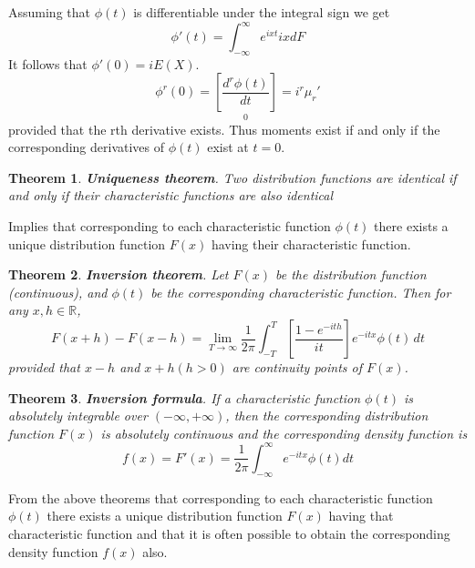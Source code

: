 \documentclass{article}
\newtheorem{theorem}{Theorem}[section]
\begin{document}
Assuming that \(\phi(t)\) is differentiable under the integral sign we get
\begin{equation*}
    \phi'(t)=\int_{-\infty}^{\infty} e^{ixt} ix dF
\end{equation*}
It follows that \(\phi'(0)=i E(X)\).
\begin{equation*}
    \phi^r(0)= \underset{0}{\left[\frac{d^r\phi(t)}{dt} \right]} = i^r\mu_r'
\end{equation*}
provided that the rth derivative exists. Thus moments exist if and only if the corresponding derivatives of \(\phi(t)\) exist at \(t=0\).

\begin{theorem} \textbf{Uniqueness theorem}.
    Two distribution functions are identical if and only if their characteristic functions are also identical
\end{theorem}
Implies that corresponding to each characteristic function \(\phi(t)\) there exists a unique distribution function \(F(x)\) having their characteristic function.

\begin{theorem} \textbf{Inversion theorem}. Let \(F(x)\) be the distribution function (continuous), and \(\phi(t)\) be the corresponding characteristic function. Then for any \(x,h \in \mathbb{R}\),
\begin{equation*}
    F(x+h)-F(x-h)= \lim_{T \rightarrow \infty} \frac{1}{2\pi} \int_{-T}^{T} \left[\frac{1-e^{-ith}}{it}\right] e^{-itx} \phi(t) \, dt
\end{equation*}
provided that \(x-h\) and \(x+h (h>0)\) are continuity points of \(F(x)\).
\end{theorem}

\begin{theorem} \textbf{Inversion formula}.
    If a characteristic function \(\phi(t)\) is absolutely integrable over \((-\infty,+\infty)\), then the corresponding distribution function \(F(x)\) is absolutely continuous and the corresponding density function is
\begin{equation*}
    f(x)=F'(x)=\frac{1}{2\pi} \int_{-\infty}^{\infty} e^{-itx} \phi(t) dt
\end{equation*}
\end{theorem}

From the above theorems that corresponding to each characteristic function \(\phi(t)\) there exists a unique distribution function \(F(x)\) having that characteristic function and that it is often possible to obtain the corresponding density function \(f(x)\) also.
\end{document}
